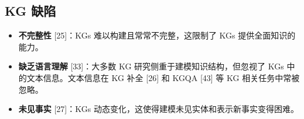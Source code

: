 \documentclass[11pt,UTF8,fontset=fandol]{ctexart}
\begin{document}
\subsection*{KG 缺陷}
\begin{itemize}
\item \textbf{不完整性} [25]：KGs 难以构建且常常不完整，这限制了 KGs 提供全面知识的能力。
\item \textbf{缺乏语言理解} [33]：大多数 KG 研究侧重于建模知识结构，但忽视了 KGs 中的文本信息。文本信息在 KG 补全 [26] 和 KGQA [43] 等 KG 相关任务中常被忽略。
\item \textbf{未见事实} [27]：KGs 动态变化，这使得建模未见实体和表示新事实变得困难。
\end{itemize}
\end{document}
